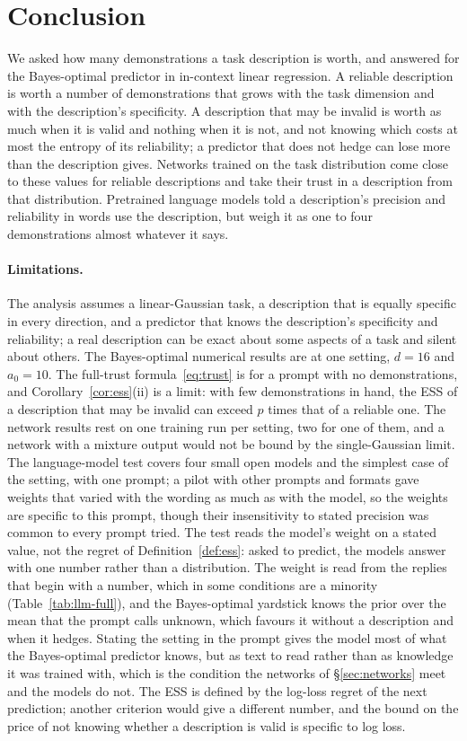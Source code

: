 \documentclass[10pt,twocolumn]{article}
\begin{document}
\section{Conclusion}
We asked how many demonstrations a task description is worth, and answered for the Bayes-optimal predictor in in-context linear regression. A reliable description is worth a number of demonstrations that grows with the task dimension and with the description's specificity. A description that may be invalid is worth as much when it is valid and nothing when it is not, and not knowing which costs at most the entropy of its reliability; a predictor that does not hedge can lose more than the description gives. Networks trained on the task distribution come close to these values for reliable descriptions and take their trust in a description from that distribution. Pretrained language models told a description's precision and reliability in words use the description, but weigh it as one to four demonstrations almost whatever it says.

\paragraph{Limitations.} The analysis assumes a linear-Gaussian task, a description that is equally specific in every direction, and a predictor that knows the description's specificity and reliability; a real description can be exact about some aspects of a task and silent about others. The Bayes-optimal numerical results are at one setting, $d = 16$ and $a_0 = 10$. The full-trust formula~\eqref{eq:trust} is for a prompt with no demonstrations, and Corollary~\ref{cor:ess}(ii) is a limit: with few demonstrations in hand, the ESS of a description that may be invalid can exceed $p$ times that of a reliable one. The network results rest on one training run per setting, two for one of them, and a network with a mixture output would not be bound by the single-Gaussian limit. The language-model test covers four small open models and the simplest case of the setting, with one prompt; a pilot with other prompts and formats gave weights that varied with the wording as much as with the model, so the weights are specific to this prompt, though their insensitivity to stated precision was common to every prompt tried. The test reads the model's weight on a stated value, not the regret of Definition~\ref{def:ess}: asked to predict, the models answer with one number rather than a distribution. The weight is read from the replies that begin with a number, which in some conditions are a minority (Table~\ref{tab:llm-full}), and the Bayes-optimal yardstick knows the prior over the mean that the prompt calls unknown, which favours it without a description and when it hedges. Stating the setting in the prompt gives the model most of what the Bayes-optimal predictor knows, but as text to read rather than as knowledge it was trained with, which is the condition the networks of \S\ref{sec:networks} meet and the models do not. The ESS is defined by the log-loss regret of the next prediction; another criterion would give a different number, and the bound on the price of not knowing whether a description is valid is specific to log loss.
\end{document}
